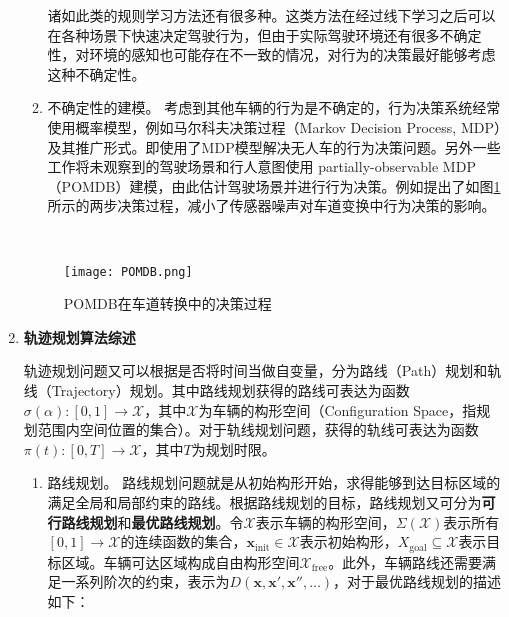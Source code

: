 \begin{enumerate}[wide=\parindent]
\begin{enumerate}[label=(\arabic*),wide=\parindent]
诸如此类的规则学习方法还有很多种。这类方法在经过线下学习之后可以在各种场景下快速决定驾驶行为，但由于实际驾驶环境还有很多不确定性，对环境的感知也可能存在不一致的情况，对行为的决策最好能够考虑这种不确定性。

\item 不确定性的建模。
考虑到其他车辆的行为是不确定的，行为决策系统经常使用概率模型，例如马尔科夫决策过程（Markov Decision Process, MDP）及其推广形式。\cite{Brechtel2011Probabilistic}即使用了MDP模型解决无人车的行为决策问题。另外一些工作将未观察到的驾驶场景和行人意图使用 partially-observable MDP （POMDB）建模，由此估计驾驶场景并进行行为决策。例如提出了如图\ref{fig:POMDB}所示的两步决策过程，减小了传感器噪声对车道变换中行为决策的影响。
\end{enumerate}
\ \\

\begin{figure}[htbp]
\centering
\texttt{[image: POMDB.png]}
\caption[POMDB在车道转换中的决策过程]{POMDB在车道转换中的决策过程\cite{Ulbrich2013Probabilistic}}
\label{fig:POMDB}
\end{figure}

\item \textbf{轨迹规划算法综述}
\label{sec:trajectory}

轨迹规划问题又可以根据是否将时间当做自变量，分为路线（Path）规划和轨线（Trajectory）规划。其中路线规划获得的路线可表达为函数 $\sigma(\alpha): [0,1]\rightarrow \mathcal{X}$，其中$\mathcal{X}$为车辆的构形空间（Configuration Space，指规划范围内空间位置的集合）。对于轨线规划问题，获得的轨线可表达为函数 $\pi(t): [0, T]\rightarrow \mathcal{X}$，其中$T$为规划时限。

\begin{enumerate}[label=(\arabic*),wide=\parindent]
\item 路线规划。 路线规划问题就是从初始构形开始，求得能够到达目标区域的满足全局和局部约束的路线。根据路线规划的目标，路线规划又可分为\textbf{可行路线规划}和\textbf{最优路线规划}。令$\mathcal{X}$表示车辆的构形空间，$\Sigma(\mathcal{X})$表示所有$[0,1]\rightarrow \mathcal{X}$的连续函数的集合，$\mathbf{x}_{\mathrm{init}}\in \mathcal{X}$表示初始构形，$X_{\mathrm{goal}}\subseteq \mathcal{X}$表示目标区域。车辆可达区域构成自由构形空间$\mathcal{X}_{\mathrm{free}}$。此外，车辆路线还需要满足一系列阶次的约束，表示为$D(\mathbf{x},\mathbf{x}',\mathbf{x}'', \dots)$，对于最优路线规划的描述如下：


\end{enumerate}
\end{enumerate}

